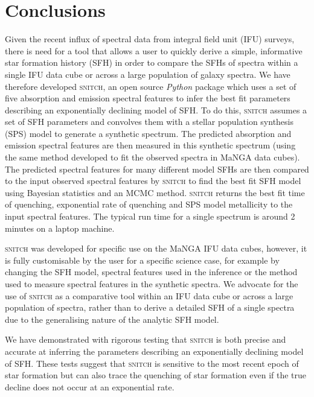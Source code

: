 \documentclass[useAMS,usenatbib]{mn2e}
\begin{document}


\section{Conclusions}

Given the recent influx of spectral data from integral field unit (IFU) surveys, there is need for a tool that allows a user to quickly derive a simple, informative star formation history (SFH) in order to compare the SFHs of spectra within a single IFU data cube or across a large population of galaxy spectra. We have therefore developed \textsc{snitch}, an open source \emph{Python} package which uses a set of five absorption and emission spectral features to infer the best fit parameters describing an exponentially declining model of SFH. To do this, \textsc{snitch} assumes a set of SFH parameters and convolves them with a stellar population synthesis (SPS) model to generate a synthetic spectrum. The predicted absorption and emission spectral features are then measured in this synthetic spectrum (using the same method developed to fit the observed spectra in MaNGA data cubes). The predicted spectral features for many different model SFHs are then compared to the input observed spectral features by \textsc{snitch} to find the best fit SFH model using Bayesian statistics and an MCMC method. \textsc{snitch} returns the best fit time of quenching, exponential rate of quenching and SPS model metallicity to the input spectral features. The typical run time for a single spectrum is around 2 minutes on a laptop machine. 

\textsc{snitch} was developed for specific use on the MaNGA IFU data cubes, however, it is fully customisable by the user for a specific science case, for example by changing the SFH model, spectral features used in the inference or the method used to measure spectral features in the synthetic spectra. We advocate for the use of \textsc{snitch} as a comparative tool within an IFU data cube or across a large population of spectra, rather than to derive a detailed SFH of a single spectra due to the generalising nature of the analytic SFH model.

We have demonstrated with rigorous testing that \textsc{snitch} is both precise and accurate at inferring the parameters describing an exponentially declining model of SFH. These tests suggest that \textsc{snitch} is sensitive to the most recent epoch of star formation but can also trace the quenching of star formation even if the true decline does not occur at an exponential rate.  
\end{document}
